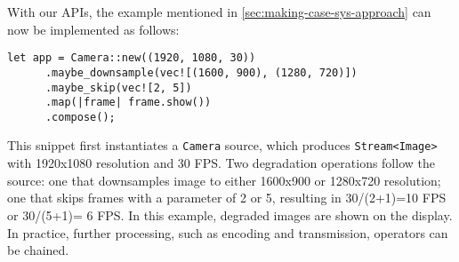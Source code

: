With our APIs, the example mentioned in \autoref{sec:making-case-sys-approach}
can now be implemented as follows:

\vspace{-2pt}
\begin{lstlisting}[caption={Video Processing Example}, label={lst:ex}]
   let app = Camera::new((1920, 1080, 30))
      .maybe_downsample(vec![(1600, 900), (1280, 720)])
      .maybe_skip(vec![2, 5])
      .map(|frame| frame.show())
      .compose();
\end{lstlisting}

This snippet first instantiates a \texttt{Camera} source, which produces
\texttt{Stream<Image>} with 1920x1080 resolution and 30 FPS. Two degradation
operations follow the source: one that downsamples image to either 1600x900 or
1280x720 resolution; one that skips frames with a parameter of 2 or 5, resulting
in 30/(2+1)=10 FPS or 30/(5+1)= 6 FPS. In this example, degraded images are
shown on the display. In practice, further processing, such as encoding and
transmission, operators can be chained.

